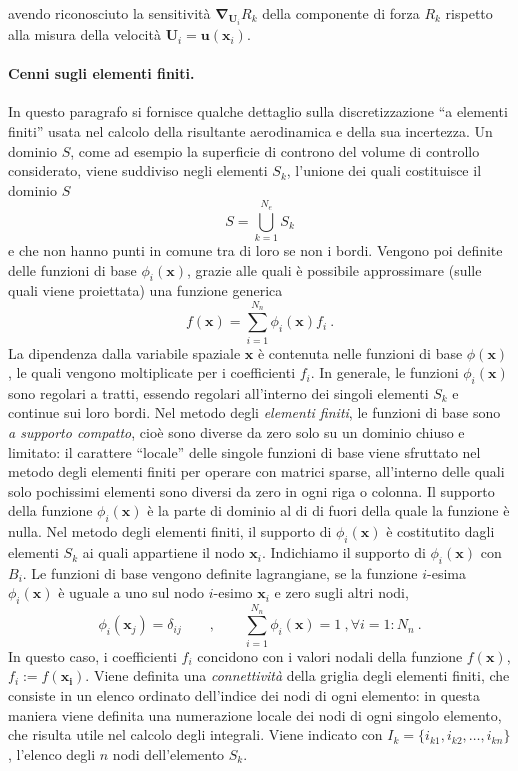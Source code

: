 avendo riconosciuto la sensitività $\bm{\nabla}_{\bm{U}_i} R_k$ della componente di forza $R_k$ rispetto alla misura della velocità $\bm{U}_i = \bm{u}(\bm{x}_i)$.

%
\paragraph{Cenni sugli elementi finiti.}\label{sec:fem}
In questo paragrafo si fornisce qualche dettaglio sulla discretizzazione ``a elementi finiti'' usata nel calcolo della risultante aerodinamica e della sua incertezza.
Un dominio $S$, come ad esempio la superficie di controno del volume di controllo considerato, viene suddiviso negli elementi $S_k$, l'unione dei quali costituisce il dominio $S$
\begin{equation}
 S = \bigcup_{k=1}^{N_e} S_k
\end{equation}
 e che non hanno punti in comune tra di loro se non i bordi. Vengono poi definite delle funzioni di base $\phi_i(\bm{x})$, grazie alle quali è possibile approssimare (sulle quali viene proiettata) una funzione generica
\begin{equation}
 f(\bm{x}) = \displaystyle\sum_{i=1}^{N_n} \phi_i(\bm{x}) f_i \ .
\end{equation}
La dipendenza dalla variabile spaziale $\bm{x}$ è contenuta nelle funzioni di base $\phi(\bm{x})$, le quali vengono moltiplicate per i coefficienti $f_i$.
\newline
In generale, le funzioni $\phi_i(\bm{x})$ sono regolari a tratti, essendo regolari all'interno dei singoli elementi $S_k$ e continue sui loro bordi.
Nel metodo degli \textit{elementi finiti}, le funzioni di base sono \textit{a supporto compatto}, cioè sono diverse da zero solo su un dominio chiuso e limitato: il carattere ``locale'' delle singole funzioni di base viene sfruttato nel metodo degli elementi finiti per operare con matrici sparse, all'interno delle quali solo pochissimi elementi sono diversi da zero in ogni riga o colonna. Il supporto della funzione $\phi_i(\bm{x})$ è la parte di dominio al di di fuori della quale la funzione è nulla. Nel metodo degli elementi finiti, il supporto di $\phi_i(\bm{x})$ è costitutito dagli elementi $S_k$ ai quali appartiene il nodo $\bm{x}_i$. Indichiamo il supporto di $\phi_i(\bm{x})$ con $B_i$.
\newline
Le funzioni di base vengono definite lagrangiane, se la funzione $i$-esima $\phi_i(\bm{x})$ è uguale a uno sul nodo $i$-esimo $\bm{x}_i$ e zero sugli altri nodi,
\begin{equation}
 \phi_i(\bm{x}_j) = \delta_{ij} \qquad , \qquad \displaystyle\sum_{i=1}^{N_n} \phi_i(\bm{x}) = 1  \ , \forall i=1:N_n \ .
\end{equation}
In questo caso, i coefficienti $f_i$ concidono con i valori nodali della funzione $f(\bm{x})$, $f_i:=f(\bm{x_i})$.
Viene definita una \textit{connettività} della griglia degli elementi finiti, che consiste in un elenco ordinato dell'indice dei nodi di ogni elemento: in questa maniera viene definita una numerazione locale dei nodi di ogni singolo elemento, che risulta utile nel calcolo degli integrali. Viene indicato con $I_k = \{ i_{k1} , i_{k2} , \dots , i_{kn} \}$, l'elenco degli $n$ nodi dell'elemento $S_k$.

